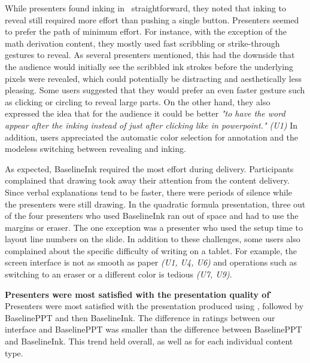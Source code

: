 While presenters found inking in \interface\ straightforward, they noted that inking to reveal still required more effort than pushing a single button. Presenters seemed to prefer the path of minimum effort. For instance, with the exception of the math derivation content, they mostly used fast scribbling or strike-through gestures to reveal. As several presenters mentioned, this had the downside that the audience would initially see the scribbled ink strokes before the underlying pixels were revealed, which could potentially be distracting and aesthetically less pleasing. Some users suggested that they would prefer an even faster gesture such as clicking or circling to reveal large parts. On the other hand, they also expressed the idea that for the audience it could be better \textit{"to have the word appear after the inking instead of just after clicking like in powerpoint." (U1)} 
%
In addition, users appreciated the automatic color selection for annotation and the modeless switching between revealing and inking. 

As expected, BaselineInk required the most effort during delivery. Participants complained that drawing took away their attention from the content delivery. Since verbal explanations tend to be faster, there were periods of silence while the presenters were still drawing. In the quadratic formula presentation, three out of the four presenters who used BaselineInk ran out of space and had to use the margins or eraser. The one exception was a presenter who used the setup time to layout line numbers on the slide. In addition to these challenges, some users also complained about the specific difficulty of writing on a tablet. For example, the screen interface is not as smooth as paper \textit{(U1, U4, U6)} and operations such as switching to an eraser or a different color is tedious \textit{(U7, U9)}. 

\textbf{Presenters were most satisfied with the presentation quality of \interface\.}
Presenters were most satisfied with the presentation produced using \interface, followed by BaselinePPT and then BaselineInk. 
%
The difference in ratings between our interface and BaselinePPT was smaller than the difference between BaselinePPT and BaselineInk. 
%
%
This trend held overall, as well as for each individual content type.


